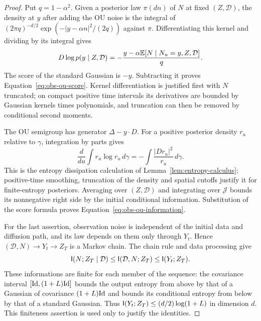 \begin{proof}
Put $q=1-\alpha^2$.  Given a posterior law $\pi(dn)$ of $N$ at
fixed $(Z,\mathcal D)$, the density at $y$ after adding the OU noise
is the integral of
$(2\pi q)^{-d/2}\exp(-|y-\alpha n|^2/(2q))$ against $\pi$.
Differentiating this kernel and dividing by its integral gives
\[
 D\log p(y\mid Z,\mathcal D)
 =-\frac{y-\alpha\mathbb E[N\mid N_u=y,Z,\mathcal D]}q.
\]
The score of the standard Gaussian is $-y$.  Subtracting it proves
Equation~\eqref{eq:obs-ou-score}.  Kernel differentiation is justified
first with $N$ truncated; on compact positive time intervals its
derivatives are bounded by Gaussian kernels times polynomials, and
truncation can then be removed by conditional second moments.

The OU semigroup has generator $\Delta-y\cdot D$.  For a positive
posterior density $r_u$ relative to $\gamma$, integration by parts
gives
\[
 \frac{d}{du}\int r_u\log r_u\,d\gamma
 =-\int\frac{|Dr_u|^2}{r_u}\,d\gamma.
\]
This is the entropy dissipation calculation of
Lemma~\ref{lem:entropy-calculus}; positive-time smoothing, truncation
of the density and spatial cutoffs justify it for finite-entropy
posteriors.  Averaging over $(Z,\mathcal D)$ and integrating over
$\mathcal J$ bounds its nonnegative right side by the initial
conditional information.  Substitution of the score formula proves
Equation~\eqref{eq:obs-ou-information}.

For the last assertion, observation noise is independent of the
initial data and diffusion path, and its law depends on them only
through $Y_t$.  Hence
$(\mathcal D,N)\longrightarrow Y_t\longrightarrow Z_T$ is a Markov
chain.  The chain rule and data processing give
\[
 \mathsf I(N;Z_T\mid\mathcal D)
 \le\mathsf I(\mathcal D,N;Z_T)\le\mathsf I(Y_t;Z_T).
\]
These informations are finite for each member of the sequence:
the covariance interval $[\mathrm{Id},(1+L)\mathrm{Id}]$ bounds the output entropy
from above by that of a Gaussian of covariance $(1+L)\mathrm{Id}$ and
bounds its conditional entropy from below by that of a standard
Gaussian.  Thus $\mathsf I(Y_t;Z_T)\le(d/2)\log(1+L)$ in dimension $d$.
This finiteness assertion is used only to justify the identities.
\end{proof}

